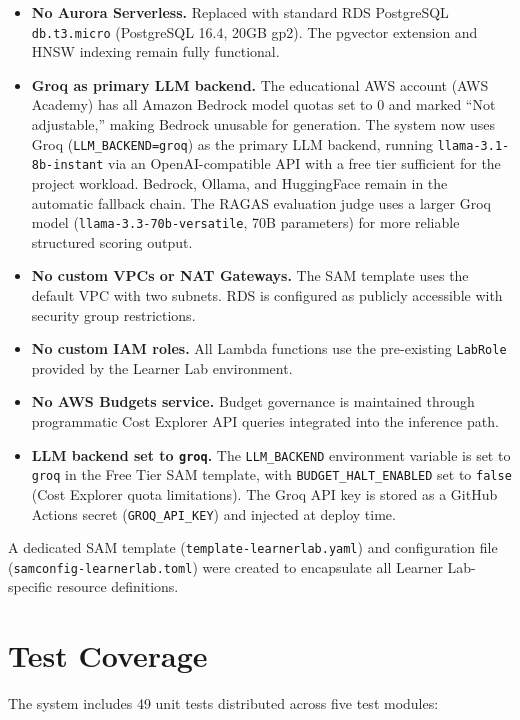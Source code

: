 \documentclass[12pt,a4paper]{report}
\begin{document}
\begin{itemize}[leftmargin=0.5in]
  \item \textbf{No Aurora Serverless.} Replaced with standard RDS PostgreSQL \texttt{db.t3.micro} (PostgreSQL 16.4, 20GB gp2). The pgvector extension and HNSW indexing remain fully functional.
  \item \textbf{Groq as primary LLM backend.} The educational AWS account (AWS Academy) has all Amazon Bedrock model quotas set to 0 and marked ``Not adjustable,'' making Bedrock unusable for generation. The system now uses Groq (\texttt{LLM\_BACKEND=groq}) as the primary LLM backend, running \texttt{llama-3.1-8b-instant} via an OpenAI-compatible API with a free tier sufficient for the project workload. Bedrock, Ollama, and HuggingFace remain in the automatic fallback chain. The RAGAS evaluation judge uses a larger Groq model (\texttt{llama-3.3-70b-versatile}, 70B parameters) for more reliable structured scoring output.
  \item \textbf{No custom VPCs or NAT Gateways.} The SAM template uses the default VPC with two subnets. RDS is configured as publicly accessible with security group restrictions.
  \item \textbf{No custom IAM roles.} All Lambda functions use the pre-existing \texttt{LabRole} provided by the Learner Lab environment.
  \item \textbf{No AWS Budgets service.} Budget governance is maintained through programmatic Cost Explorer API queries integrated into the inference path.
  \item \textbf{LLM backend set to \texttt{groq}.} The \texttt{LLM\_BACKEND} environment variable is set to \texttt{groq} in the Free Tier SAM template, with \texttt{BUDGET\_HALT\_ENABLED} set to \texttt{false} (Cost Explorer quota limitations). The Groq API key is stored as a GitHub Actions secret (\texttt{GROQ\_API\_KEY}) and injected at deploy time.
\end{itemize}

A dedicated SAM template (\texttt{template-learnerlab.yaml}) and configuration file (\texttt{samconfig-learnerlab.toml}) were created to encapsulate all Learner Lab-specific resource definitions.

\section{Test Coverage}
\label{sec:tests}

The system includes 49 unit tests distributed across five test modules:
\end{document}
